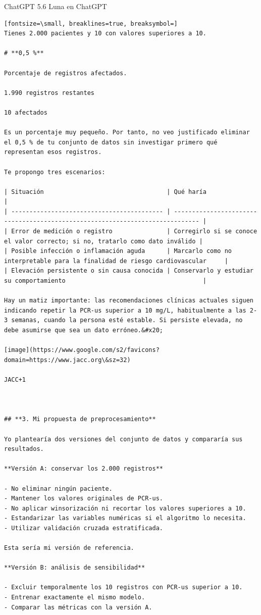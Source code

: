 \documentclass[12pt,a4paper,oneside]{book}
\begin{document}
\begin{iaresp}{ChatGPT 5.6 Luna en ChatGPT}
\begin{Verbatim}[fontsize=\small, breaklines=true, breaksymbol=]
Tienes 2.000 pacientes y 10 con valores superiores a 10.

# **0,5 %**

Porcentaje de registros afectados.

1.990 registros restantes

10 afectados

Es un porcentaje muy pequeño. Por tanto, no veo justificado eliminar el 0,5 % de tu conjunto de datos sin investigar primero qué representan esos registros.

Te propongo tres escenarios:

| Situación                                  | Qué haría                                                                     |
| ------------------------------------------ | ----------------------------------------------------------------------------- |
| Error de medición o registro               | Corregirlo si se conoce el valor correcto; si no, tratarlo como dato inválido |
| Posible infección o inflamación aguda      | Marcarlo como no interpretable para la finalidad de riesgo cardiovascular     |
| Elevación persistente o sin causa conocida | Conservarlo y estudiar su comportamiento                                      |

Hay un matiz importante: las recomendaciones clínicas actuales siguen indicando repetir la PCR-us superior a 10 mg/L, habitualmente a las 2-3 semanas, cuando la persona esté estable. Si persiste elevada, no debe asumirse que sea un dato erróneo.&#x20;

[image](https://www.google.com/s2/favicons?domain=https://www.jacc.org\&sz=32)

JACC+1



## **3. Mi propuesta de preprocesamiento**

Yo plantearía dos versiones del conjunto de datos y compararía sus resultados.

**Versión A: conservar los 2.000 registros**

- No eliminar ningún paciente.
- Mantener los valores originales de PCR-us.
- No aplicar winsorización ni recortar los valores superiores a 10.
- Estandarizar las variables numéricas si el algoritmo lo necesita.
- Utilizar validación cruzada estratificada.

Esta sería mi versión de referencia.

**Versión B: análisis de sensibilidad**

- Excluir temporalmente los 10 registros con PCR-us superior a 10.
- Entrenar exactamente el mismo modelo.
- Comparar las métricas con la versión A.


\end{Verbatim}
\end{iaresp}
\end{document}

